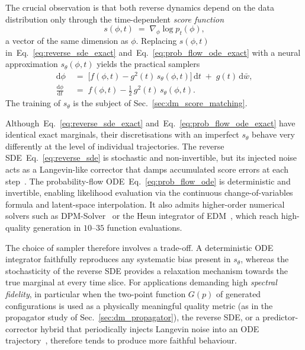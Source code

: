 \documentclass[reprint,twocolumn,superscriptaddress,preprintnumbers,amsmath,amssymb,aps,prd,floatfix]{revtex4-2}
\def\Eq#1{Eq.~\eqref{#1}}
\def\Sec#1{Sec.~\ref{#1}}
\begin{document}
The crucial observation is that both reverse dynamics depend on the data distribution only through the time-dependent \emph{score function}
\begin{equation}
s(\phi,t) \;=\; \nabla_{\phi}\log p_{t}(\phi),
\label{eq:score_def}
\end{equation}
a vector of the same dimension as $\phi$. Replacing $s(\phi,t)$ in~\Eq{eq:reverse_sde_exact} and~\Eq{eq:prob_flow_ode_exact} with a neural approximation $s_{\theta}(\phi,t)$ yields the practical samplers
\begin{align}
\mathrm{d}\phi &\;=\; \bigl[f(\phi,t)-g^{2}(t)\,s_{\theta}(\phi,t)\bigr]\,\mathrm{d}t \;+\; g(t)\,\mathrm{d}\bar{w},
\label{eq:reverse_sde}\\
\frac{\mathrm{d}\phi}{\mathrm{d}t} &\;=\; f(\phi,t)-\tfrac{1}{2}\,g^{2}(t)\,s_{\theta}(\phi,t).
\label{eq:prob_flow_ode}
\end{align}
The training of $s_{\theta}$ is the subject of \Sec{sec:dm_score_matching}.

Although~\Eq{eq:reverse_sde_exact} and~\Eq{eq:prob_flow_ode_exact} have identical exact marginals, their discretisations with an imperfect $s_{\theta}$ behave very differently at the level of individual trajectories. The reverse SDE~\Eq{eq:reverse_sde} is stochastic and non-invertible, but its injected noise acts as a Langevin-like corrector that damps accumulated score errors at each step~\cite{Karras2022EDM}. The probability-flow ODE~\Eq{eq:prob_flow_ode} is deterministic and invertible, enabling likelihood evaluation via the continuous change-of-variables formula and latent-space interpolation. It also admits higher-order numerical solvers such as DPM-Solver~\cite{LuDPMSolver2022} or the Heun integrator of EDM~\cite{Karras2022EDM}, which reach high-quality generation in $10$--$35$ function evaluations.

The choice of sampler therefore involves a trade-off. A deterministic ODE integrator faithfully reproduces any systematic bias present in $s_{\theta}$, whereas the stochasticity of the reverse SDE provides a relaxation mechanism towards the true marginal at every time slice. For applications demanding high \emph{spectral fidelity}, in particular when the two-point function $G(p)$ of generated configurations is used as a physically meaningful quality metric (as in the propagator study of \Sec{sec:dm_propagator}), the reverse SDE, or a predictor-corrector hybrid that periodically injects Langevin noise into an ODE trajectory~\cite{Song2021SDE}, therefore tends to produce more faithful behaviour.
\end{document}
